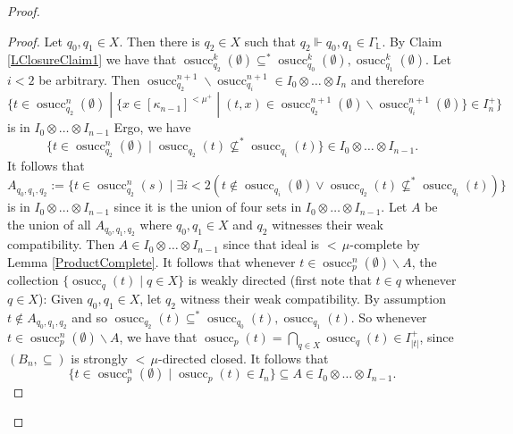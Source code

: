 \documentclass[a4paper]{amsart}
\theoremstyle{definition}
\theoremstyle{remark}
\theoremstyle{plain}
\numberwithin{mydef}{section}
\DeclareMathOperator{\osucc}{osucc}
\newcommand{\dL}{\mathbb{L}}
\begin{document}
\begin{proof}
		\begin{proof}
			Let $q_0,q_1\in X$. Then there is $q_2\in X$ such that $q_2\Vdash q_0,q_1\in\Gamma_{\dL}$. By Claim \ref{LClosureClaim1} we have that $\osucc_{q_2}^{k}(\emptyset)\subseteq^*\osucc_{q_0}^{k}(\emptyset),\osucc_{q_1}^{k}(\emptyset)$. Let $i<2$ be arbitrary. Then $\osucc_{q_2}^{n+1}\smallsetminus\osucc_{q_i}^{n+1}\in I_0\otimes\dots\otimes I_{n}$ and therefore
			$$\{t\in\osucc_{q_2}^n(\emptyset)\;|\;\{x\in[\kappa_{n-1}]^{<\mu^+}\;|\;(t,x)\in\osucc_{q_2}^{n+1}(\emptyset)\smallsetminus\osucc_{q_i}^{n+1}(\emptyset)\}\in I_n^+\}$$
			is in $I_0\otimes\dots\otimes I_{n-1}$
			Ergo, we have
			$$\{t\in\osucc_{q_2}^n(\emptyset)\;|\;\osucc_{q_2}(t)\not\subseteq^*\osucc_{q_i}(t)\}\in I_0\otimes\dots\otimes I_{n-1}.$$
			It follows that
			$$A_{q_0,q_1,q_2}:=\{t\in\osucc_{q_2}^n(s)\;|\;\exists i<2(t\notin\osucc_{q_i}(\emptyset)\vee\osucc_{q_2}(t)\not\subseteq^*\osucc_{q_i}(t))\}$$
			is in $I_0\otimes\dots\otimes I_{n-1}$ since it is the union of four sets in $I_0\otimes\dots\otimes I_{n-1}$. Let $A$ be the union of all $A_{q_0,q_1,q_2}$ where $q_0,q_1\in X$ and $q_2$ witnesses their weak compatibility. Then $A\in I_0\otimes\dots\otimes I_{n-1}$ since that ideal is ${<}\,\mu$-complete by Lemma \ref{ProductComplete}. It follows that whenever $t\in\osucc_p^n(\emptyset)\smallsetminus A$, the collection $\{\osucc_q(t)\;|\;q\in X\}$ is weakly directed (first note that $t\in q$ whenever $q\in X$): Given $q_0,q_1\in X$, let $q_2$ witness their weak compatibility. By assumption $t\notin A_{q_0,q_1,q_2}$ and so $\osucc_{q_2}(t)\subseteq^*\osucc_{q_0}(t),\osucc_{q_1}(t)$. So whenever $t\in\osucc_p^n(\emptyset)\smallsetminus A$, we have that $\osucc_p(t)=\bigcap_{q\in X}\osucc_q(t)\in I_{|t|}^+$, since $(B_n,\subseteq)$ is strongly ${<}\,\mu$-directed closed. It follows that
			$$\{t\in\osucc_p^n(\emptyset)\;|\;\osucc_p(t)\in I_n\}\subseteq A\in I_0\otimes\dots\otimes I_{n-1}.$$
		\end{proof}
		

\end{proof}
\end{document}
